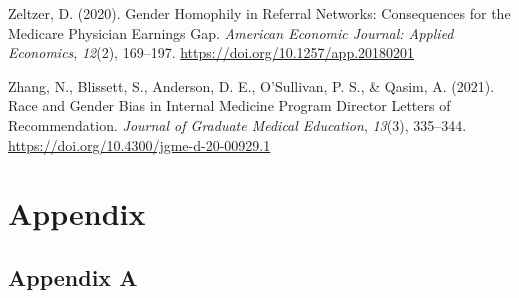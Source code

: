 \documentclass[12pt]{caltech_thesis}
\begin{document}
    Zeltzer, D. (2020). Gender Homophily in Referral Networks: Consequences for the Medicare Physician Earnings Gap. \textit{American Economic Journal: Applied Economics}, \textit{12}(2), 169--197. \url{https://doi.org/10.1257/app.20180201}

    Zhang, N., Blissett, S., Anderson, D. E., O'Sullivan, P. S., \& Qasim, A. (2021). Race and Gender Bias in Internal Medicine Program Director Letters of Recommendation. \textit{Journal of Graduate Medical Education}, \textit{13}(3), 335--344. \url{https://doi.org/10.4300/jgme-d-20-00929.1}

\chapter{Appendix}
\section{Appendix A}
\end{document}
